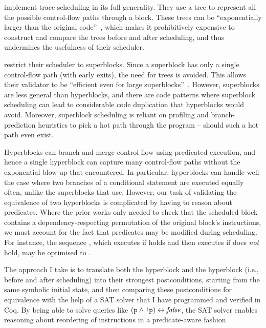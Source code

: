 \citeauthor{tristan08_formal_verif_trans_valid} implement trace scheduling in
its full generality. They use a tree to represent all the possible control-flow
paths through a block. These trees can be ``exponentially larger than the
original code''~\cite[p.~25]{tristan08_formal_verif_trans_valid}, which makes it
prohibitively expensive to construct and compare the trees before and after
scheduling, and thus undermines the usefulness of their scheduler.

\citeauthor{six22_formal_verif_super_sched} restrict their scheduler to
superblocks. Since a superblock has only a single control-flow path (with early
exits), the need for trees is avoided. This allows their validator to be
``efficient even for large
superblocks''~\cite[p.~53]{six22_formal_verif_super_sched}. However, superblocks
are less general than hyperblocks, and there are code patterns where superblock
scheduling can lead to considerable code duplication that hyperblocks would
avoid. Moreover, superblock scheduling is reliant on profiling and
branch-prediction heuristics to pick a hot path through the program -- should
such a hot path even exist.

Hyperblocks can branch and merge control flow using predicated execution, and
hence a single hyperblock can capture many control-flow paths without the
exponential blow-up that \citeauthor{tristan08_formal_verif_trans_valid}
encountered.  In particular, hyperblocks can handle well the case where two
branches of a conditional statement are executed equally often, unlike the
superblocks that \citeauthor{six22_formal_verif_super_sched} use. However, our
task of validating the equivalence of two hyperblocks is complicated by having
to reason about predicates. Where the prior works only needed to check that the
scheduled block contains a dependency-respecting permutation of the original
block's instructions, we must account for the fact that predicates may be
modified during scheduling. For instance, the sequence %
, which executes  if  holds
and then executes  if  does \emph{not} hold, may be
optimised to .

The approach I take is to translate both the \rtlblock{} hyperblock and the
\rtlpar{} hyperblock (i.e., before and after scheduling) into their strongest
postconditions, starting from the same symbolic initial state, and then
comparing these postconditions for equivalence with the help of a SAT solver
that I have programmed and verified in Coq. By being able to solve queries like
$(\texttt{p} \land \texttt{!p}) \leftrightarrow \mathit{false}$, the SAT solver enables
reasoning about reordering of instructions in a predicate-aware fashion.

